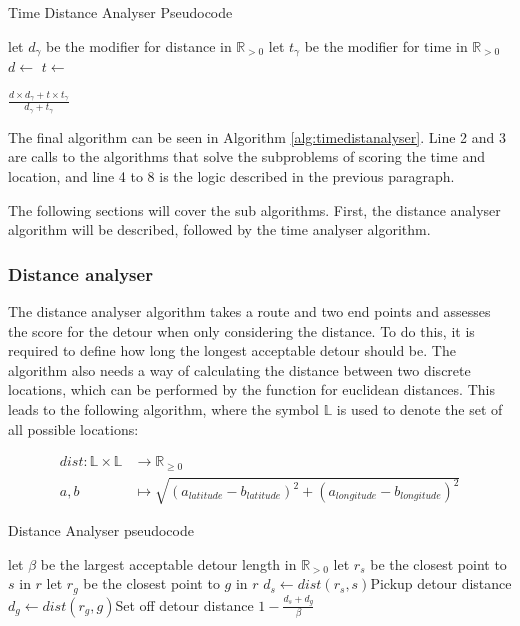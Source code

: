 \begin{algorithm}
	\caption{Time Distance Analyser Pseudocode}
	\label{alg:timedistanalyser}
	\begin{algorithmic}[1]
		\Require 
		\Statex let $d_\gamma$ be the modifier for distance in $\mathbb{R}_{>0}$
		\Statex let $t_\gamma$ be the modifier for time in $\mathbb{R}_{>0}$
		\Statex 
			\State $d\gets$
			\State $t\gets$

				\State \Return $\frac{d\times d_\gamma+t\times t_\gamma}{d_\gamma+t_\gamma}$
			\Else
				\State{}
			\EndIf
		\EndFunction
	\end{algorithmic}
\end{algorithm}

The final algorithm can be seen in Algorithm \ref{alg:timedistanalyser}.
Line 2 and 3 are calls to the algorithms that solve the subproblems of scoring the time and location, and line 4 to 8 is the logic described in the previous paragraph.

The following sections will cover the sub algorithms.
First, the distance analyser algorithm will be described, followed by the time analyser algorithm.

\subsubsection{Distance analyser}
The distance analyser algorithm takes a route and two end points and assesses the score for the detour when only considering the distance.
To do this, it is required to define how long the longest acceptable detour should be.
The algorithm also needs a way of calculating the distance between two discrete locations, which can be performed by the function for euclidean distances.
This leads to the following algorithm, where the symbol $\mathbb{L}$ is used to denote the set of all possible locations:

\begin{align*}
	dist : \mathbb{L}\times\mathbb{L} &\rightarrow \mathbb{R}_{\geq 0}\\
	a, b &\mapsto \sqrt{(a_{latitude} - b_{latitude})^2 + (a_{longitude} - b_{longitude})^2}
\end{align*}

\begin{algorithm}
	\caption{Distance Analyser pseudocode}
	\label{alg:distanalyser}
	\begin{algorithmic}[1]
		\Require 
		\Statex let $\beta$ be the largest acceptable detour length in $\mathbb{R}_{>0}$ 
		\Statex 
			\State let $r_s$ be the closest point to $s$ in $r$
			\State let $r_g$ be the closest point to $g$ in $r$
			\State $d_s\gets dist(r_s, s)$\Comment Pickup detour distance
			\State $d_g\gets dist(r_g, g)$\Comment Set off detour distance
			\State\Return $1-\frac{d_s + d_g}{\beta}$
		\EndFunction
	\end{algorithmic}
\end{algorithm}

